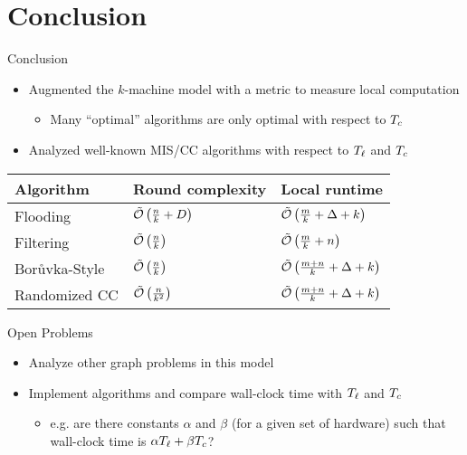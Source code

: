 \section{Conclusion}

\begin{frame}{Conclusion}
    \begin{itemize}
        \item Augmented the $k$-machine model with a metric to measure local computation 
        \begin{itemize}
            \item Many ``optimal'' algorithms are only optimal with respect to $T_c$
        \end{itemize}
        \item Analyzed well-known MIS/CC algorithms with respect to $T_{\ell}$ and $T_c$ 
    \end{itemize}
    \pause
    \begin{tabular}{@{}lll@{}}\toprule
        Algorithm                  & Round complexity          & Local runtime                        \\\midrule
        Flooding                   & $\tilde{\mathcal{O}}\left(\frac{n}{k} + D\right)$ & $\tilde{\mathcal{O}}\left(\frac{m}{k} + \Delta + k\right)$   \\
        Filtering                  & $\tilde{\mathcal{O}}\left(\frac{n}{k}\right)$     & $\tilde{\mathcal{O}}\left(\frac{m}{k} + n\right)$            \\
        Bor\r{u}vka-Style & $\tilde{\mathcal{O}}\left(\frac{n}{k}\right)$     & $\tilde{\mathcal{O}}\left(\frac{m+n}{k} + \Delta + k\right)$ \\
        Randomized CC              & $\tilde{\mathcal{O}}\left(\frac{n}{k^2}\right)$   & $\tilde{\mathcal{O}}\left(\frac{m+n}{k} + \Delta + k\right)$
    \end{tabular}
\end{frame}

\begin{frame}{Open Problems}
    \begin{itemize}
        \item Analyze other graph problems in this model
        \item Implement algorithms and compare wall-clock time with $T_{\ell}$ and $T_c$
        \begin{itemize}
            \item e.g. are there constants $\alpha$ and $\beta$ (for a given set of hardware)
            such that wall-clock time is $\alpha T_{\ell} + \beta T_c$?
        \end{itemize}
    \end{itemize}
\end{frame}